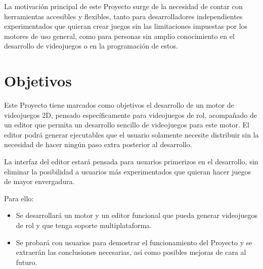 \medskip

La motivación principal de este Proyecto surge de la necesidad de contar con herramientas accesibles y flexibles, tanto para desarrolladores independientes experimentados que quieran crear juegos sin las limitaciones impuestas por los motores de uso general, como para personas sin amplio conocimiento en el desarrollo de videojuegos o en la programación de estos.

\section{Objetivos}
Este Proyecto tiene marcados como objetivos el desarrollo de un motor de videojuegos 2D, pensado específicamente para videojuegos de rol, acompañado de un editor que permita un desarrollo sencillo de videojuegos para este motor. El editor podrá generar ejecutables que el usuario solamente necesite distribuir sin la necesidad de hacer ningún paso extra posterior al desarrollo.

\smallskip

La interfaz del editor estará pensada para usuarios primerizos en el desarrollo, sin eliminar la posibilidad a usuarios más experimentados que quieran hacer juegos de mayor envergadura.

\medskip

Para ello:
\begin{itemize}
	\item Se desarrollará un motor y un editor funcional que pueda generar videojuegos de rol y que tenga soporte multiplataforma.
	\item Se probará con usuarios para demostrar el funcionamiento del Proyecto y se extraerán las conclusiones necesarias, así como posibles mejoras de cara al futuro.
\end{itemize}

